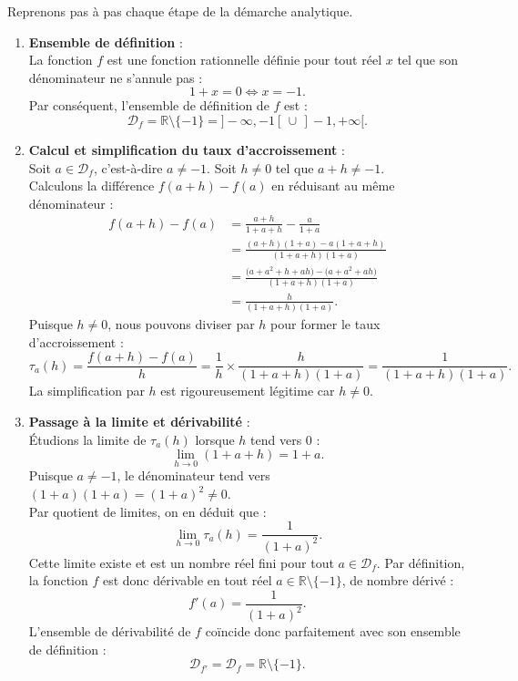 \documentclass[11pt,a4paper]{article}
\newcommand{\R}{\mathbb{R}}
\begin{document}
\begin{correctionbox}
Reprenons pas à pas chaque étape de la démarche analytique.

\begin{enumerate}[label=\textbf{\arabic*.}]
    \item \textbf{Ensemble de définition} :\\
    La fonction $f$ est une fonction rationnelle définie pour tout réel $x$ tel que son dénominateur ne s'annule pas :
    \[
    1 + x = 0 \iff x = -1.
    \]
    Par conséquent, l'ensemble de définition de $f$ est :
    \[
    \mathcal{D}_f = \R \setminus \{-1\} = ]-\infty, -1[\, \cup\, ]-1, +\infty[.
    \]

    \item \textbf{Calcul et simplification du taux d'accroissement} :\\
    Soit $a \in \mathcal{D}_f$, c'est-à-dire $a \neq -1$. Soit $h \neq 0$ tel que $a+h \neq -1$.\\
    Calculons la différence $f(a+h) - f(a)$ en réduisant au même dénominateur :
    \begin{align*}
    f(a+h) - f(a) &= \frac{a+h}{1+a+h} - \frac{a}{1+a} \\
    &= \frac{(a+h)(1+a) - a(1+a+h)}{(1+a+h)(1+a)} \\
    &= \frac{\big(a + a^2 + h + ah\big) - \big(a + a^2 + ah\big)}{(1+a+h)(1+a)} \\
    &= \frac{h}{(1+a+h)(1+a)}.
    \end{align*}
    Puisque $h \neq 0$, nous pouvons diviser par $h$ pour former le taux d'accroissement :
    \[
    \tau_a(h) = \frac{f(a+h) - f(a)}{h} = \frac{1}{h} \times \frac{h}{(1+a+h)(1+a)} = \frac{1}{(1+a+h)(1+a)}.
    \]
    La simplification par $h$ est rigoureusement légitime car $h \neq 0$.

    \item \textbf{Passage à la limite et dérivabilité} :\\
    Étudions la limite de $\tau_a(h)$ lorsque $h$ tend vers $0$ :
    \[
    \lim_{h \to 0} (1+a+h) = 1+a.
    \]
    Puisque $a \neq -1$, le dénominateur tend vers $(1+a)(1+a) = (1+a)^2 \neq 0$.\\
    Par quotient de limites, on en déduit que :
    \[
    \lim_{h \to 0} \tau_a(h) = \frac{1}{(1+a)^2}.
    \]
    Cette limite existe et est un nombre réel fini pour tout $a \in \mathcal{D}_f$.
    Par définition, la fonction $f$ est donc dérivable en tout réel $a \in \R \setminus \{-1\}$, de nombre dérivé :
    \[
    f'(a) = \frac{1}{(1+a)^2}.
    \]
    L'ensemble de dérivabilité de $f$ coïncide donc parfaitement avec son ensemble de définition :
    \[
    \mathcal{D}_{f'} = \mathcal{D}_f = \R \setminus \{-1\}.
    \]


\end{enumerate}
\end{correctionbox}
\end{document}
